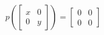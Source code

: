 \documentclass[preview]{standalone}
\begin{document}
\begin{center}
$p\left(\begin{bmatrix} x & 0 \\ 0 & y \end{bmatrix}\right) = \begin{bmatrix} 0 & 0 \\ 0 & 0 \end{bmatrix}$
\end{center}
\end{document}
